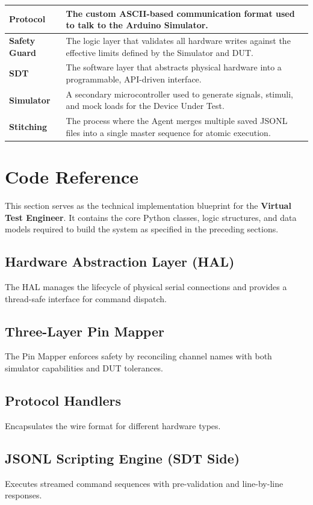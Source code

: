 \documentclass[conference]{IEEEtran}
\begin{document}
\begin{table}[htbp]
\begin{center}
\begin{tabular}{|p{2.5cm}|p{5cm}|}
\hline
\textbf{Protocol} & The custom ASCII-based communication format used to talk to the Arduino Simulator. \\
\hline
\textbf{Safety Guard} & The logic layer that validates all hardware writes against the effective limits defined by the Simulator and DUT. \\
\hline
\textbf{SDT} & The software layer that abstracts physical hardware into a programmable, API-driven interface. \\
\hline
\textbf{Simulator} & A secondary microcontroller used to generate signals, stimuli, and mock loads for the Device Under Test. \\
\hline
\textbf{Stitching} & The process where the Agent merges multiple saved JSONL files into a single master sequence for atomic execution. \\
\hline
\end{tabular}
\end{center}
\end{table}

\section{Code Reference}
This section serves as the technical implementation blueprint for the \textbf{Virtual Test Engineer}. It contains the core Python classes, logic structures, and data models required to build the system as specified in the preceding sections.

\subsection{Hardware Abstraction Layer (HAL)}
The HAL manages the lifecycle of physical serial connections and provides a thread-safe interface for command dispatch.

\subsection{Three-Layer Pin Mapper}
The Pin Mapper enforces safety by reconciling channel names with both simulator capabilities and DUT tolerances.

\subsection{Protocol Handlers}
Encapsulates the wire format for different hardware types.

\subsection{JSONL Scripting Engine (SDT Side)}
Executes streamed command sequences with pre-validation and line-by-line responses.
\end{document}
